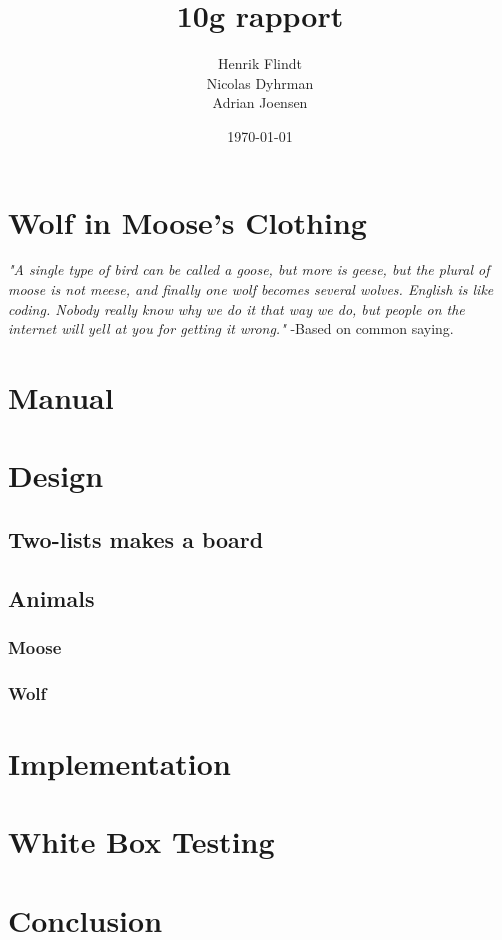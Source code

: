 \documentclass{article}
\title{10g rapport}
\author{Henrik Flindt\\Nicolas Dyhrman\\Adrian Joensen}
\date{\today}
\begin{document}
    \maketitle
    
    \section*{Wolf in Moose's Clothing}
    \textit{"A single type of bird can be called a goose, but more is geese, but the plural of moose is not meese, and finally one wolf becomes several wolves. English is like coding. Nobody really know why we do it that way we do, but people on the internet will yell at you for getting it wrong."} \newline -Based on common saying.
    \section{Manual}
   
    
    \section{Design}
    \subsection{Two-lists makes a board}
    \subsection{Animals}
    \subsubsection{Moose}
    \subsubsection{Wolf}    

    \section{Implementation}
       
         
    \section{White Box Testing}
   	   
    \section{Conclusion}
     
\end{document}
